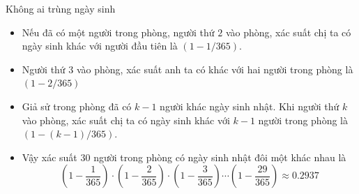\begin{frame}{Không ai trùng ngày sinh}
	\begin{itemize}
		\item Nếu đã có một người trong phòng, người thứ $2$ vào phòng, xác suất chị ta có ngày sinh khác với người đầu tiên là $(1 - 1/365)$.
		\item Người thứ $3$ vào phòng, xác suất anh ta có  khác với hai người trong phòng là $(1 - 2/365)$ 
		\item Giả sử trong phòng đã có $k-1$ người khác ngày sinh nhật. Khi người thứ $k$ vào phòng, xác suất chị ta có ngày sinh khác với $k-1$ người trong phòng là $(1 - (k-1)/365)$.  
		\item  Vậy xác suất $30$ người trong phòng có ngày sinh nhật đôi một khác nhau là 
		\[
			\left(1 - \frac{1}{365}\right) \cdot \left(1 - \frac{2}{365}\right) \cdot \left(1 - \frac{3}{365}\right) \cdots \left(1 - \frac{29}{365}\right) \approx 0.2937
		\] 
	\end{itemize}
\end{frame}

